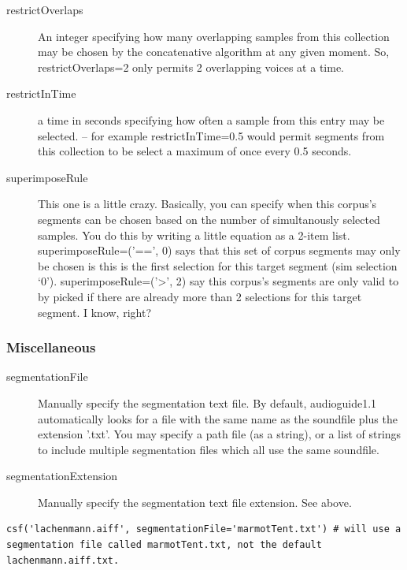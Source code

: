 \documentclass{article}
\newcommand{\ag}{audioguide1.1 }
\begin{document}
\begin{spacing}{1.2}
\begin{description}
\item[restrictOverlaps] An integer specifying how many overlapping samples from this collection may be chosen by the concatenative algorithm at any given moment.  So, restrictOverlaps=2 only permits 2 overlapping voices at a time.

\item[restrictInTime] a time in seconds specifying how often a sample from this entry may be selected. -- for example restrictInTime=0.5 would permit segments from this collection to be select a maximum of once every 0.5 seconds.


\item[superimposeRule]  This one is a little crazy.  Basically, you can specify when this corpus's segments can be chosen based on the number of simultanously selected samples.  You do this by writing a little equation as a 2-item list.  superimposeRule=('==', 0) says that this set of corpus segments may only be chosen is this is the first selection for this target segment (sim selection `0').  superimposeRule=('>', 2) say this corpus's segments are only valid to by picked if there are already more than 2 selections for this target segment.  I know, right?
\end{description}


\subsubsection{Miscellaneous}
\begin{description}
\item[segmentationFile] Manually specify the segmentation text file. By default, \ag automatically looks for a file with the same name as the soundfile plus the extension '.txt'. You may specify a path file (as a string), or a list of strings to include multiple segmentation files which all use the same soundfile.

\item[segmentationExtension] Manually specify the segmentation text file extension.  See above.
\end{description}

\begin{lstlisting}
csf('lachenmann.aiff', segmentationFile='marmotTent.txt') # will use a segmentation file called marmotTent.txt, not the default lachenmann.aiff.txt.


\end{lstlisting}
\end{spacing}
\end{document}
